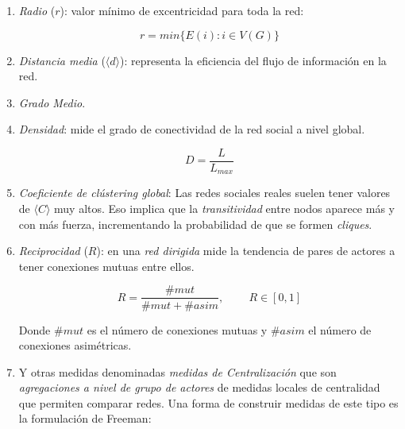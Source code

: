 \documentclass[10pt,spanish, landscape, twocolumn]{article}
\begin{document}
\begin{enumerate}[\color{tematres}{$\star$}]
\begin{enumerate}[---]
        \item \textit{\textcolor{tematres}{Radio}} ($r$): valor mínimo de excentricidad para toda la red:

        \begin{displaymath}
            r = min \{ E(i): i \in V (G) \}
        \end{displaymath}

        \item \textit{\textcolor{tematres}{Distancia media}} ($\langle d \rangle$): representa la eficiencia del flujo de información en la red.

        \item \textit{\textcolor{tematres}{Grado Medio}}.

        \item \textit{\textcolor{tematres}{Densidad}}: mide el grado de conectividad de la red social a nivel global.

        \begin{displaymath}
            D = \frac{L}{L_{max}}
        \end{displaymath}

        \item \textit{\textcolor{tematres}{Coeficiente de clústering global}}: Las redes sociales reales suelen tener valores de $\langle C \rangle$ muy altos. Eso implica que la \textit{\textcolor{tematres}{transitividad}} entre nodos aparece más y con más fuerza, incrementando la probabilidad de que se formen \textit{\textcolor{tematres}{cliques}}.

        \item \textit{\textcolor{tematres}{Reciprocidad}} ($R$): en una \textit{\textcolor{tematres}{red dirigida}} mide la tendencia de pares de actores a tener conexiones mutuas entre ellos.

        \begin{displaymath}
            R = \frac{\# mut}{\# mut + \# asim}, \qquad\ R \in [0,1]
        \end{displaymath}

        Donde $\#mut$ es el número de conexiones mutuas y $\#asim$ el número de conexiones asimétricas.
        
        \item Y otras medidas denominadas \textit{\textcolor{tematres}{medidas de Centralización}} que son \textit{\textcolor{tematres}{agregaciones a nivel de grupo de actores}} de medidas locales de centralidad que permiten comparar redes. Una forma de construir medidas de este tipo es la formulación de Freeman:


\end{enumerate}
\end{enumerate}
\end{document}
